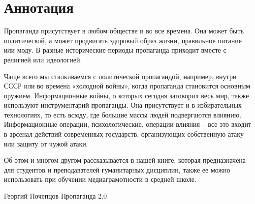  
 
 
 
 

\section{Аннотация}

\begin{qqquote}
Пропаганда присутствует в любом обществе и во все времена. Она может быть
политической, а может продвигать здоровый образ жизни, правильное питание или
моду. В разные исторические периоды пропаганда приходит вместе с религией или
идеологией.

Чаще всего мы сталкиваемся с политической пропагандой, например, внутри СССР
или во времена «холодной войны», когда пропаганда становится основным оружием.
Информационные войны, о которых сегодня заговорил весь мир, также используют
инструментарий пропаганды. Она присутствует и в избирательных технологиях, то
есть всюду, где большие массы людей подвергаются влиянию. Информационные
операции, психологические, операции влияния – все это входит в арсенал действий
современных государств, организующих собственную атаку или защиту от чужой
атаки.

Об этом и многом другом рассказывается в нашей книге, которая предназначена для
студентов и преподавателей гуманитарных дисциплин, также ее можно использовать
при обучении медиаграмотности в средней школе.
\end{qqquote}

Георгий Почепцов
Пропаганда 2.0
